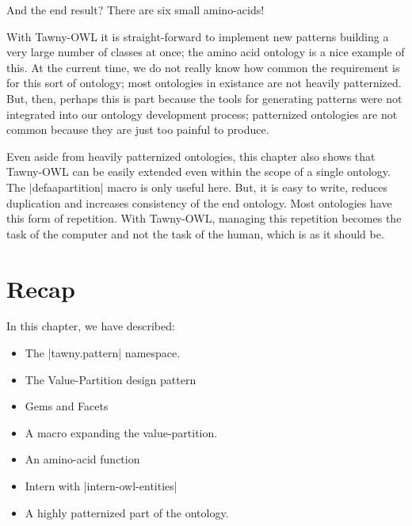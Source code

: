 And the end result? There are six small amino-acids!

With Tawny-OWL it is straight-forward to implement new patterns building a
very large number of classes at once; the amino acid ontology is a nice
example of this. At the current time, we do not really know how common the
requirement is for this sort of ontology; most ontologies in existance are not
heavily patternized. But, then, perhaps this is part because the tools for
generating patterns were not integrated into our ontology development process;
patternized ontologies are not common because they are just too painful to
produce.

Even aside from heavily patternized ontologies, this chapter also shows that
Tawny-OWL can be easily extended even within the scope of a single ontology.
The |defaapartition| macro is only useful here. But, it is easy to write,
reduces duplication and increases consistency of the end ontology. Most
ontologies have this form of repetition. With Tawny-OWL, managing this
repetition becomes the task of the computer and not the task of the human,
which is as it should be.

\section{Recap}
\label{sec:recap-2}

In this chapter, we have described:

\begin{itemize}
\item The |tawny.pattern| namespace.
\item The Value-Partition design pattern
\item Gems and Facets
\item A macro expanding the value-partition.
\item An amino-acid function
\item Intern with |intern-owl-entities|
\item A highly patternized part of the ontology.
\end{itemize}

